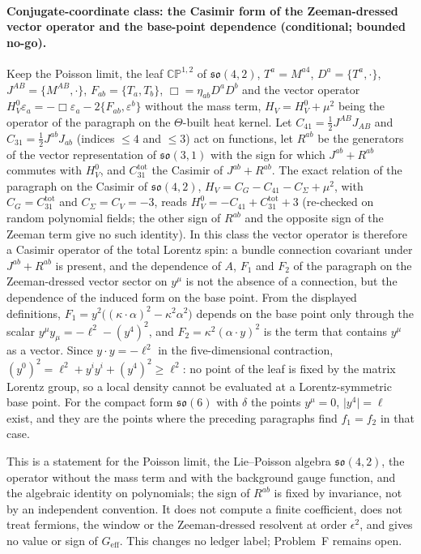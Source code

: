 \paragraph{Conjugate-coordinate class: the Casimir form of the Zeeman-dressed vector operator and the base-point dependence (conditional; bounded no-go).}
Keep the Poisson limit, the leaf \(\mathbb{CP}^{1,2}\) of \(\mathfrak{so}(4,2)\), \(T^a=M^{a4}\), \(D^a=\{T^a,\cdot\}\), \(J^{AB}=\{M^{AB},\cdot\}\), \(F_{ab}=\{T_a,T_b\}\), \(\Box=\eta_{ab}D^aD^b\) and the vector operator \(H_V^{0}\varepsilon_a=-\Box\varepsilon_a-2\{F_{ab},\varepsilon^b\}\) without the mass term, \(H_V=H_V^{0}+\mu^2\) being the operator of the paragraph on the \(\Theta\)-built heat kernel. Let \(C_{41}=\tfrac12J^{AB}J_{AB}\) and \(C_{31}=\tfrac12J^{ab}J_{ab}\) (indices \(\le4\) and \(\le3\)) act on functions, let \(R^{ab}\) be the generators of the vector representation of \(\mathfrak{so}(3,1)\) with the sign for which \(J^{ab}+R^{ab}\) commutes with \(H_V^{0}\), and \(C_{31}^{\mathrm{tot}}\) the Casimir of \(J^{ab}+R^{ab}\). The exact relation of the paragraph on the Casimir of \(\mathfrak{so}(4,2)\), \(H_V=C_G-C_{41}-C_\Sigma+\mu^2\), with \(C_G=C_{31}^{\mathrm{tot}}\) and \(C_\Sigma=C_V=-3\), reads \(H_V^{0}=-C_{41}+C_{31}^{\mathrm{tot}}+3\) (re-checked on random polynomial fields; the other sign of \(R^{ab}\) and the opposite sign of the Zeeman term give no such identity). In this class the vector operator is therefore a Casimir operator of the total Lorentz spin: a bundle connection covariant under \(J^{ab}+R^{ab}\) is present, and the dependence of \(A\), \(F_1\) and \(F_2\) of the paragraph on the Zeeman-dressed vector sector on \(y^\mu\) is not the absence of a connection, but the dependence of the induced form on the base point. From the displayed definitions, \(F_1=y^2\bigl((\kappa\cdot\alpha)^2-\kappa^2\alpha^2\bigr)\) depends on the base point only through the scalar \(y^\mu y_\mu=-\ell^2-(y^4)^2\), and \(F_2=\kappa^2(\alpha\cdot y)^2\) is the term that contains \(y^\mu\) as a vector. Since \(y\cdot y=-\ell^2\) in the five-dimensional contraction, \((y^0)^2=\ell^2+y^iy^i+(y^4)^2\ge\ell^2\): no point of the leaf is fixed by the matrix Lorentz group, so a local density cannot be evaluated at a Lorentz-symmetric base point. For the compact form \(\mathfrak{so}(6)\) with \(\delta\) the points \(y^\mu=0\), \(\lvert y^4\rvert=\ell\) exist, and they are the points where the preceding paragraphs find \(f_1=f_2\) in that case.

This is a statement for the Poisson limit, the Lie--Poisson algebra \(\mathfrak{so}(4,2)\), the operator without the mass term and with the background gauge function, and the algebraic identity on polynomials; the sign of \(R^{ab}\) is fixed by invariance, not by an independent convention. It does not compute a finite coefficient, does not treat fermions, the window or the Zeeman-dressed resolvent at order \(\epsilon^2\), and gives no value or sign of \(G_{\mathrm{eff}}\). This changes no ledger label; Problem~F remains open.

